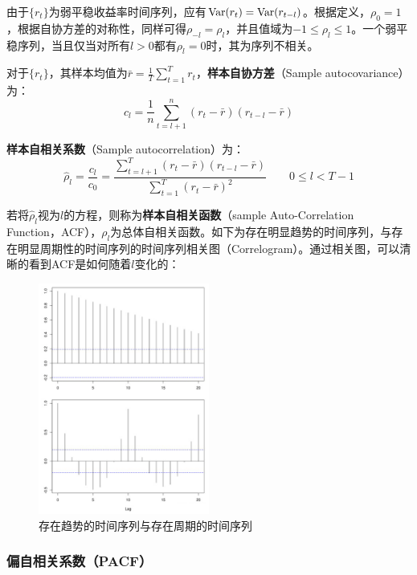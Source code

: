 \documentclass[11pt]{article}
\begin{document}
由于$\{r_t\}$为弱平稳收益率时间序列，应有$\operatorname{Var}(r_t) = \operatorname{Var}(r_{t-l})$。根据定义，$\rho_0=1$，根据自协方差的对称性，同样可得$\rho_{-l}=\rho_l$，并且值域为$-1 \leq \rho_l \leq 1$。一个弱平稳序列，当且仅当对所有$l>0$都有$\rho_l=0$时，其为序列不相关。

对于$\{r_t\}$，其样本均值为$\bar{r}=\frac{1}{T} \sum_{t=1}^{T} r_t$，\textbf{样本自协方差}（Sample autocovariance）为：
\begin{equation*}
    c_l = \frac{1}{n} \sum_{t=l+1}^{n} (r_t-\bar{r})(r_{t-l}-\bar{r})
\end{equation*}

\textbf{样本自相关系数}（Sample autocorrelation）为：
\begin{equation*}
    \hat{\rho}_l = \frac{c_l}{c_0} = \frac{\sum_{t=l+1}^{T}(r_t-\bar{r})(r_{t-l}-\bar{r})}{\sum_{t=1}^{T}(r_t-\bar{r})^2} \qquad 0 \leq l < T-1
\end{equation*}

若将$\hat{\rho}_l$视为$l$的方程，则称为\textbf{样本自相关函数}（sample Auto-Correlation Function，ACF），$\rho_l$为总体自相关函数。如下为存在明显趋势的时间序列，与存在明显周期性的时间序列的时间序列相关图（Correlogram）。通过相关图，可以清晰的看到ACF是如何随着$l$变化的：

\begin{figure}[H]
    \centering
    \includegraphics[width=0.5\textwidth]{fig/ts-trend.png}
    \caption{存在趋势的时间序列与存在周期的时间序列}
    \label{fig:ts-trend}
\end{figure}

\subsubsection{偏自相关系数（PACF）}
\end{document}
